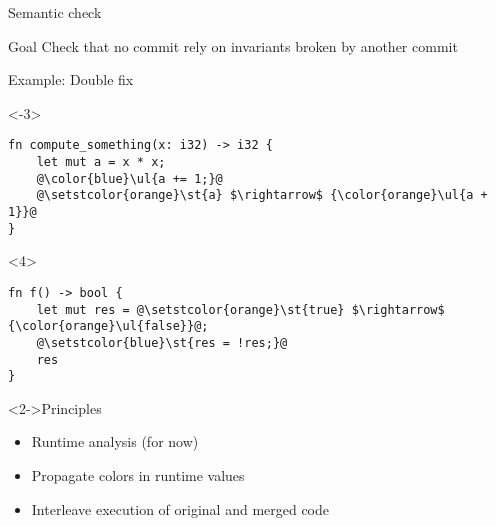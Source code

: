 \documentclass{beamer}
\makeatletter
\let\UL\ul
\renewcommand\ul{%
  \let\set@color\beamerorig@set@color
  \let\reset@color\beamerorig@reset@color
  \UL}
\let\ST\st
\renewcommand\st{%
  \let\set@color\beamerorig@set@color
  \let\reset@color\beamerorig@reset@color
  \ST}
\makeatother
\begin{document}
\begin{frame}[fragile]{Semantic check}
\begin{alertblock}{Goal}
Check that no commit rely on invariants broken by another commit
\end{alertblock}

\begin{exampleblock}{Example: Double fix}
\begin{onlyenv}<-3>
\begin{lstlisting}
fn compute_something(x: i32) -> i32 {
    let mut a = x * x;
    @\color{blue}\ul{a += 1;}@
    @\setstcolor{orange}\st{a} $\rightarrow$ {\color{orange}\ul{a + 1}}@
}
\end{lstlisting}
\end{onlyenv}
\begin{onlyenv}<4>
\begin{lstlisting}
fn f() -> bool {
    let mut res = @\setstcolor{orange}\st{true} $\rightarrow$ {\color{orange}\ul{false}}@;
    @\setstcolor{blue}\st{res = !res;}@
    res
}
\end{lstlisting}
\end{onlyenv}
\end{exampleblock}

\begin{block}<2->{Principles}
\begin{itemize}
 \item<2-> Runtime analysis (for now)
 \item<3-> Propagate colors in runtime values
 \item<4-> Interleave execution of original and merged code
\end{itemize}
\end{block}
\end{frame}
\end{document}

